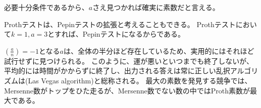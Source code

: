 必要十分条件であるから、$a$さえ見つかれば確実に素数だと言える。


Prothテストは、Pepinテストの拡張と考えることもできる。
Prothテストにおいて$k=1,a=3$とすれば、Pepinテストになるからである。

$\left(\frac{a}{n}\right)=-1$となる$a$は、全体の半分ほど存在しているため、実用的にはそれほど試行せずに見つけられる。
このように、運が悪いといつまでも終了しないが、平均的には時間がかからずに終了し、出力される答えは常に正しい乱択アルゴリズムは(Las Vegas algorithm)と総称される。
最大の素数を発見する競争では、Mersenne数がトップをひた走るが、Mersenne数でない数の中ではProth素数が最大である。
